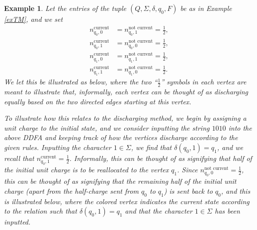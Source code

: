 \documentclass[12pt]{article}
\newtheorem{example}{Example}
\begin{document}
\begin{example}\label{exTMlike}
 Let the entries of the tuple 
 $(Q, \Sigma, \delta, q_0, F)$ 
 be as in Example \ref{exTM}, and we set 
\begin{align*}
 n_{q_{0}, 0}^{\text{current}} & = n_{q_{0}, 1}^{\text{not current}} = \frac{1}{2}, \\
 n_{q_{0}, 1}^{\text{current}} & = n_{q_{0}, 0}^{\text{not current}} = \frac{1}{2}, \\ 
 n_{q_{1}, 0}^{\text{current}} & = n_{q_{1}, 1}^{\text{not current}} = \frac{1}{2}, \\ 
 n_{q_{1}, 1}^{\text{current}} & = n_{q_{1}, 0}^{\text{not current}} = \frac{1}{2}. 
\end{align*}
 We let this be illustrated as below, where the two ``$\frac{1}{2}$'' symbols in each vertex 
 are meant to illustrate that, informally, each vertex can be thought of as discharging 
 equally based on the two directed edges starting at this vertex. 
\begin{center} 
\end{center}
\noindent To illustrate how this relates to the discharging method, we begin by assigning a unit charge to the initial state, 
 and we consider 
 inputting the string $1010$ into the above 
 DDFA and keeping track of how the vertices discharge according to the given rules. 
 Inputting the character $1 \in \Sigma$, we find that $\delta(q_0, 1) = q_1$, and we recall that $n_{q_{0}, 1}^{\text{current}} = 
 \frac{1}{2}$. Informally, this can be thought of as signifying that half of the initial unit charge is to be reallocated to the 
 vertex $q_{1}$. Since $n_{q_{0}, 0}^{\text{not current}} = \frac{1}{2}$, this can be thought of as signifying that the remaining half of 
 the initial unit charge (apart from the half-charge sent from $q_0$ to $q_1$) is sent back to $q_{0}$, and this is illustrated below, 
 where the colored vertex indicates the current state according to the relation such that $\delta(q_0, 1) = q_1$ and that the 
 character $1 \in \Sigma$ has been inputted. 
\begin{center}
\begin{tikzpicture} [draw=black!80!black,
 node distance = 3cm, 
 on grid, 
 auto,
 every loop/.style={stealth-}]


\end{tikzpicture}
\end{center}
\end{example}
\end{document}
